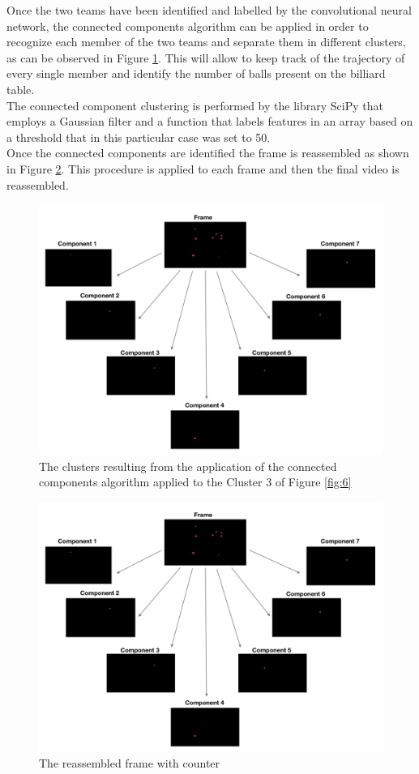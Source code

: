 \documentclass{usiinftr}
\begin{document}
Once the two teams have been identified and labelled by the convolutional neural network, the connected components algorithm can be applied in order to recognize each member of the two teams and separate them in different clusters, as can be observed in Figure \ref{fig:7}. This will allow to keep track of the trajectory of every single member and identify the number of balls present on the billiard table. \\
The connected component clustering is performed by the library SciPy that employs a Gaussian filter and a function that labels features in an array based on a threshold that in this particular case was set to 50. \\
Once the connected components are identified the frame is reassembled as shown in Figure \ref{fig:8}. This procedure is applied to each frame and then the final video is reassembled. 
\begin{figure}[h]
	\centering
	\includegraphics[width=0.8\linewidth]{./img/cc}
	\caption{The clusters resulting from the application of the connected components algorithm applied to the Cluster 3 of Figure \ref{fig:6}}
	\label{fig:7}
\end{figure}


\begin{figure}[h]
	\centering
	\includegraphics[width=0.8\linewidth]{./img/cc}
	\caption{The reassembled frame with counter}
	\label{fig:8}
\end{figure}
\end{document}
